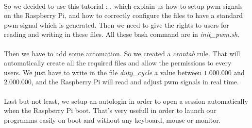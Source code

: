 \paragraph{}So we decided to use this tutorial : \cite{pi_pwm}, 
which explain us how to setup pwm signals on the Raspberry Pi,
and how to correctly configure the files to have a standard pwm signal
which is generated. Then we need to give the rights to users for reading and
writing in these files. All these bash command are in \textit{init\_pwm.sh}.

\paragraph{}
Then we have to add some automation. So we created a \textit{crontab} rule.
That will automatically create all the required files and allow the permissions
to every users. We just have to write in the file \textit{duty\_cycle} a value between
$1.000.000$ and $2.000.000$, and the Raspberry Pi will read and adjust pwm signals
in real time.

\paragraph{}
Last but not least, we setup an autologin in order to open a session automatically
when the Raspberry Pi boot. That's very usefull in order to launch our programms
easily on boot and without any keyboard, mouse or monitor.